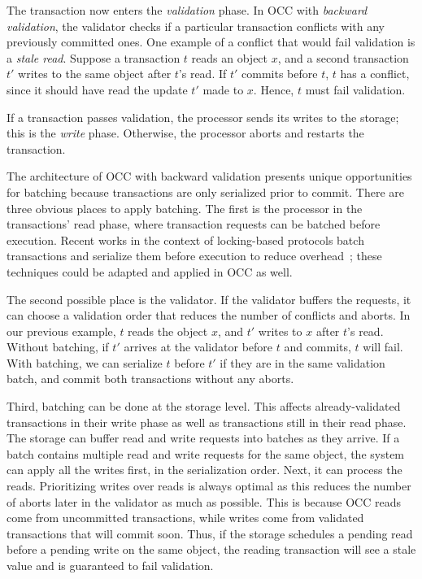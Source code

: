 The transaction now enters the \emph{validation} phase. In OCC with \emph{backward validation}, the validator checks if a particular transaction conflicts with any previously committed ones. 
One example of a conflict that would fail validation is a \emph{stale read}. Suppose a transaction $t$ reads an object $x$, and a second transaction
$t'$ writes to the same object after $t$'s read. If $t'$ commits before $t$, $t$
has a conflict, since it should have read the update $t'$ made to $x$. Hence, $t$ must fail validation. 

If a transaction passes validation, the processor sends its writes to the storage; this is the \emph{write} phase. Otherwise, the processor aborts and restarts the transaction.

The architecture of OCC with backward validation presents unique opportunities for batching because transactions are only serialized prior to commit. 
There are three obvious places to apply batching. The first is the processor in
the transactions' read phase, where transaction requests can be batched before
execution. Recent works in the context of locking-based protocols batch transactions and serialize them before execution to reduce overhead~\cite{faleiro2014rethinking,mu2014extracting,thomson2012calvin}; these techniques could be adapted and applied in OCC as well.

The second possible place is the validator. If the validator buffers the requests,
it can choose a validation order that reduces the number of conflicts and
aborts. In our previous example, $t$ reads the object $x$,
and $t'$ writes to $x$ after $t$'s read. Without batching, if $t'$ arrives at
the validator before $t$ and commits, $t$ will fail. With
batching, we can serialize $t$ before $t'$ if they are in the same validation
batch, and commit both transactions without any aborts.

Third, batching can be done at the storage level. This affects
already-validated transactions in their write phase as well as transactions
still in their read phase. The storage can buffer read and write requests into
batches as they arrive. If a batch contains multiple read and write requests for
the same object, the system can apply all the writes first, in the serialization
order. Next, it can process the reads. Prioritizing writes over reads is always
optimal as this reduces the number of aborts later in the validator as much as possible. This is
because OCC reads come from uncommitted transactions, while writes come from
validated transactions that will commit soon. Thus, if the storage schedules a
pending read before a pending write on the same object, the reading transaction will see a stale value and is guaranteed to fail validation. 

